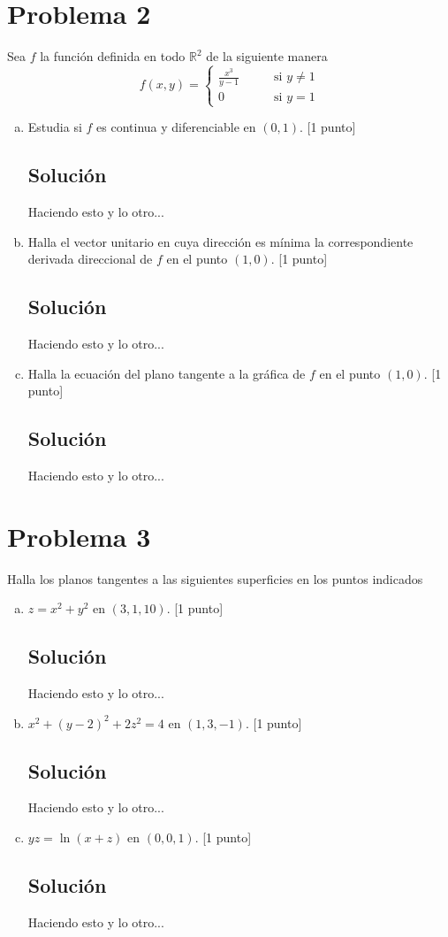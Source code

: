 \documentclass[12pt,reqno]{article}
\newcommand{\bbR}{\mathbb{R}}
\begin{document}
	\section*{Problema 2}
	Sea $f$ la función definida en todo $\bbR^2$ de la siguiente manera
	\begin{equation*}
		f(x,y)=
		\left\{
		\begin{aligned}
			\frac{x^3}{y-1} &\qquad\text{si $y\neq 1$}\\
			0 &\qquad\text{si }y=1
		\end{aligned}
		\right.
	\end{equation*}
	\begin{enumerate}[(a)]
		\item Estudia si $f$ es continua y diferenciable en $(0,1)$. [1 punto]
		\subsection*{Solución}
		Haciendo esto y lo otro...
		\item Halla el vector unitario en cuya dirección es mínima la correspondiente derivada direccional de $f$ en el punto $(1,0)$. [1 punto]
		\subsection*{Solución}
		Haciendo esto y lo otro...
		\item Halla la ecuación del plano tangente a la gráfica de $f$ en el punto $(1,0)$. [1 punto]
		\subsection*{Solución}
		Haciendo esto y lo otro...
	\end{enumerate}
	
	\newpage
	
	\section*{Problema 3}
	Halla los planos tangentes a las siguientes superficies en los puntos indicados
	\begin{enumerate}[(a)]
		\item $z=x^2+y^2$ en $(3,1,10)$. [1 punto]
		\subsection*{Solución}
		Haciendo esto y lo otro...
		\item $x^2+(y-2)^2+2z^2=4$ en $(1,3,-1)$. [1 punto]
		\subsection*{Solución}
		Haciendo esto y lo otro...
		\item $yz=\ln(x+z)$ en $(0,0,1)$. [1 punto]
		\subsection*{Solución}
		Haciendo esto y lo otro...
	\end{enumerate}
	
\end{document}
